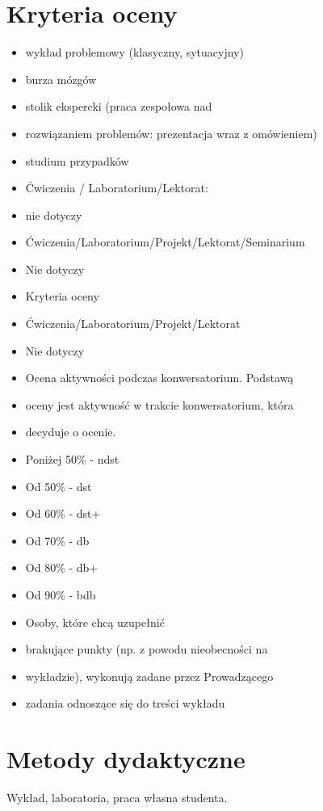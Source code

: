 \documentclass[12pt, a4paper]{article}
\begin{document}
\section{Kryteria oceny}

\begin{itemize}
  \item wykład problemowy (klasyczny, sytuacyjny)
  \item burza mózgów
  \item stolik ekspercki (praca zespołowa nad
  \item rozwiązaniem problemów: prezentacja wraz z omówieniem)
  \item studium przypadków
  \item Ćwiczenia / Laboratorium/Lektorat:
  \item nie dotyczy
  \item Ćwiczenia/Laboratorium/Projekt/Lektorat/Seminarium
  \item Nie dotyczy
  \item Kryteria oceny
  \item Ćwiczenia/Laboratorium/Projekt/Lektorat
  \item Nie dotyczy
  \item Ocena aktywności podczas konwersatorium. Podstawą
  \item oceny jest aktywność w trakcie konwersatorium, która
  \item decyduje o ocenie.
  \item Poniżej 50\% - ndst
  \item Od 50\% - dst
  \item Od 60\% - dst+
  \item Od 70\% - db
  \item Od 80\% - db+
  \item Od 90\% - bdb
  \item Osoby, które chcą uzupełnić
  \item brakujące punkty (np. z powodu nieobecności na
  \item wykładzie), wykonują zadane przez Prowadzącego
  \item zadania odnoszące się do treści wykładu
\end{itemize}

\section{Metody dydaktyczne}

Wykład, laboratoria, praca własna studenta.
\end{document}
